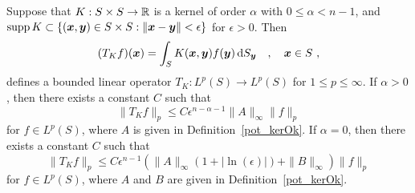 \begin{prop} \label{pot_lin_op_K}
Suppose that $K:S\times S \rightarrow \mathbb{R}$ is a kernel of order $\alpha$
with $0\leq \alpha < n-1$, and 
$\operatorname{supp} K \subset \{({\bm{x}}, {\bm{y}}) \in S \times S :
\|{\bm{x}}-{\bm{y}}\| <\epsilon \}$ for $\epsilon > 0$.  Then
\[
(T_K f)({\bm{x}}) = \int_S K({\bm{x}},{\bm{y}}) f({\bm{y}}) \,\mathrm{d}{S}_{{\bm{y}}}
\quad , \quad {\bm{x}} \in S \ ,
\]
defines a bounded linear operator
$\displaystyle T_K : L^p(S) \rightarrow L^p(S)$
for $1\leq p \leq \infty$.
If $\alpha>0$, then there exists a constant $C$ such that
\begin{equation} \label{pot_TK_Bound1}
\| T_K f \|_p \leq C \epsilon^{n-\alpha-1} \|A\|_{\infty} \|f\|_p
\end{equation}
for $\displaystyle f \in L^p(S)$,
where $A$ is given in Definition~\ref{pot_kerOk}.  If $\alpha = 0$,
then there exists a constant $C$ such that
\begin{equation} \label{pot_TK_Bound2}
\| T_K f \|_p \leq C \epsilon^{n-1} \left( \|A\|_{\infty}
(1 + |\ln(\epsilon)|) + \|B\|_\infty \right) \|f\|_p
\end{equation}
for $\displaystyle f \in L^p(S)$, where $A$ and $B$ are given in
Definition~\ref{pot_kerOk}.
\end{prop}

